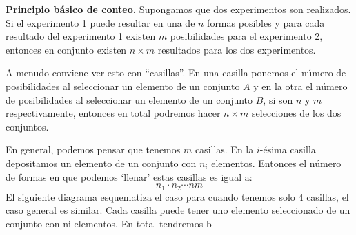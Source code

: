 \documentclass[14pt]{extreport}
\begin{document}
\begin{tcolorbox}
 \textbf{Principio básico de conteo.}
\tcblower
Supongamos que dos experimentos son realizados. Si el experimento 1 puede resultar en una de $n$ formas posibles y para cada resultado del experimento 1 existen $m$ posibilidades para el experimento 2, entonces en conjunto existen $n\times m$ resultados para los dos experimentos.
\end{tcolorbox}
  
A menudo conviene ver esto con ``casillas''. En una casilla ponemos el número de posibilidades al seleccionar un elemento de un conjunto $A$ y en la otra el número de posibilidades al seleccionar un elemento de un conjunto $B$, si son $n$ y $m$ respectivamente, entonces en total podremos hacer $n\times m$ selecciones de los dos conjuntos. 

\begin{center}
	
\end{center}

En general, podemos pensar que tenemos $m$ casillas. En la $i$-ésima casilla depositamos un elemento de un conjunto con $n_i$ elementos. Entonces el número de formas en que podemos `llenar' estas casillas es igual a:
$$
n_1\cdot n_2 \cdots nm 
$$
El siguiente diagrama esquematiza el caso para cuando tenemos solo 4 casillas, el caso general es similar. Cada casilla puede tener uno elemento seleccionado de un conjunto con ni elementos. En total tendremos b
\end{document}
